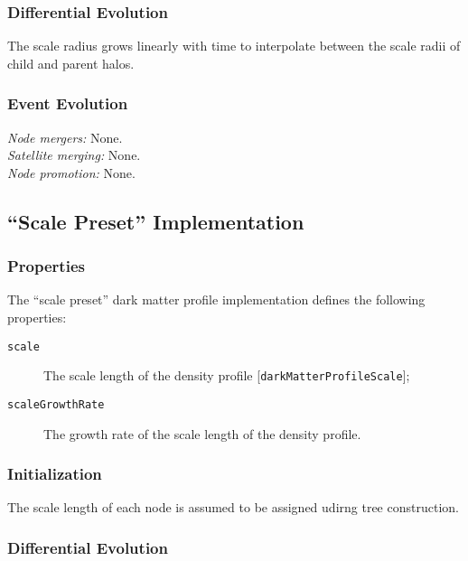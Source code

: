 \subsubsection{Differential Evolution}

The scale radius grows linearly with time to interpolate between the scale radii of child and parent halos.

\subsubsection{Event Evolution}

\noindent\emph{Node mergers:} None.\\

\noindent\emph{Satellite merging:} None.\\

\noindent\emph{Node promotion:} None.\\

\subsection{``Scale Preset'' Implementation}\label{sec:DarkMatterProfileScalePreset}

\subsubsection{Properties}

The ``scale preset'' dark matter profile implementation defines the following properties:
\begin{description}
 \item [{\tt scale}] The scale length of the density profile [{\tt darkMatterProfileScale}];
 \item [{\tt scaleGrowthRate}] The growth rate of the scale length of the density profile.
\end{description}

\subsubsection{Initialization}

The scale length of each node is assumed to be assigned udirng tree construction.

\subsubsection{Differential Evolution}

